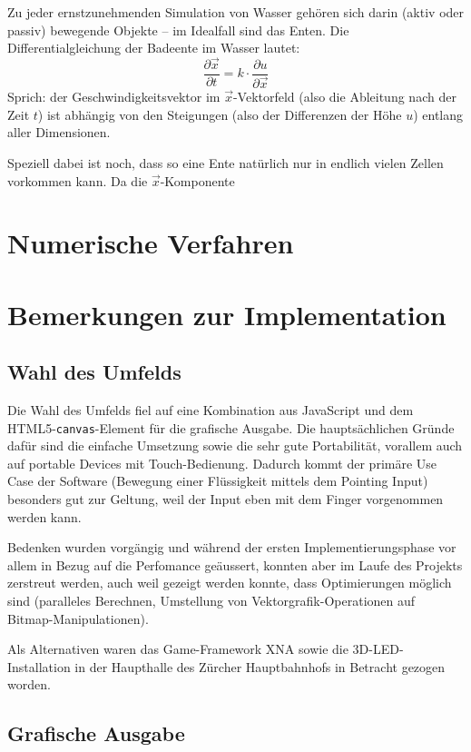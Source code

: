 \documentclass[11pt]{article} %
\theoremstyle{definition}
\begin{document}
Zu jeder ernstzunehmenden Simulation von Wasser gehören sich darin (aktiv oder passiv) bewegende Objekte -- im Idealfall sind das Enten. Die Differentialgleichung der Badeente im Wasser lautet:
\[
\frac{\partial \vec{x}}{\partial t} = k\cdot \frac{\partial u}{\partial \vec{x}}
\]
Sprich: der Geschwindigkeitsvektor im $\vec{x}$-Vektorfeld (also die Ableitung nach der Zeit $t$) ist abhängig von den Steigungen (also der Differenzen der Höhe $u$) entlang aller Dimensionen.

Speziell dabei ist noch, dass so eine Ente natürlich nur in endlich vielen Zellen vorkommen kann. Da die $\vec{x}$-Komponente 

\section{Numerische Verfahren}

\section{Bemerkungen zur Implementation}

\subsection{Wahl des Umfelds}

Die Wahl des Umfelds fiel auf eine Kombination aus JavaScript und dem HTML5-{\tt canvas}-Element für die grafische Ausgabe. Die hauptsächlichen Gründe dafür sind die einfache Umsetzung sowie die sehr gute Portabilität, vorallem auch auf portable Devices mit Touch-Bedienung. Dadurch kommt der primäre Use Case der Software (Bewegung einer Flüssigkeit mittels dem Pointing Input) besonders gut zur Geltung, weil der Input eben mit dem Finger vorgenommen werden kann.

Bedenken wurden vorgängig und während der ersten Implementierungsphase vor allem in Bezug auf die Perfomance geäussert, konnten aber im Laufe des Projekts zerstreut werden, auch weil gezeigt werden konnte, dass Optimierungen möglich sind (paralleles Berechnen, Umstellung von Vektorgrafik-Operationen auf Bitmap-Manipulationen).

Als Alternativen waren das Game-Framework XNA sowie die 3D-LED-Installation in der Haupthalle des Zürcher Hauptbahnhofs in Betracht gezogen worden.

\subsection{Grafische Ausgabe}
\end{document}
